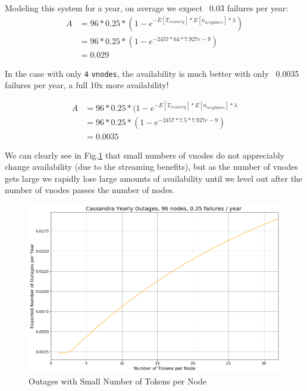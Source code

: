 \documentclass{article}
\begin{document}
Modeling this system for a year, on average we expect ~0.03 failures per year:
\begin{equation}
    \begin{split}
    A & = 96 * 0.25 * (1 - e^{-E[T_{recovery}] * E[n_{neighbors}] * \lambda}) \\
    & = 96 * 0.25 * (1 - e^{-2457 * 64 * 7.927e-9}) \\
    & = 0.029
    \end{split}
\end{equation}

In the case with only \texttt{4} \texttt{vnodes}, the availability is much better with only ~0.0035 failures per year, a full 10x more availability!

\begin{equation}
    \begin{split}
    A & = 96 * 0.25 * (1 - e^{-E[T_{recovery}] * E[n_{neighbors}] * \lambda} \\
    & = 96 * 0.25 * (1 - e^{-2457 * 7.5 * 7.927e-9}) \\
    & = 0.0035
    \end{split}
\end{equation}


We can clearly see in Fig.\ref{fig:outages_small_vnodes} that small numbers of vnodes do not appreciably change availability (due to the streaming benefits), but as the number of vnodes gets large we rapidly lose large amounts of availability until we level out after the number of vnodes passes the number of nodes.

\begin{figure}[h!]
    \centering
    \includegraphics[width=1.0\textwidth]{images/outages_vnodes_small.png}
    \caption{Outages with Small Number of Tokens per Node}
    \label{fig:outages_small_vnodes}
\end{figure}
\end{document}
